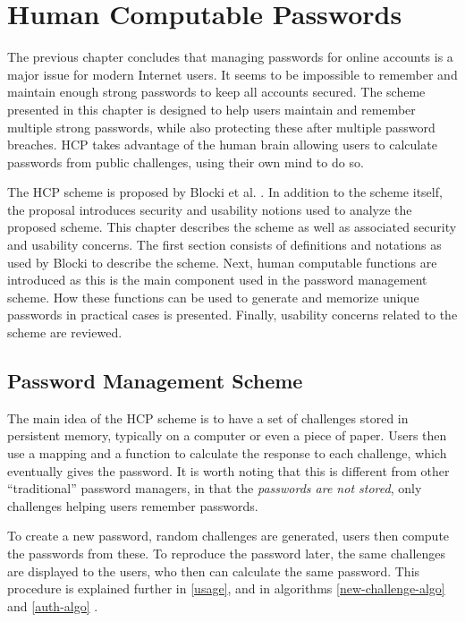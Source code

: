 \chapter{Human Computable Passwords}\label{ch:hcp}
The previous chapter concludes that managing passwords for online accounts is a major issue for modern Internet users. It seems to be impossible to remember and maintain enough strong passwords to keep all accounts secured. The scheme presented in this chapter is designed to help users maintain and remember multiple strong passwords, while also protecting these after multiple password breaches. HCP takes advantage of the human brain allowing users to calculate passwords from public challenges, using their own mind to do so. 

\par The HCP scheme is proposed by Blocki et al. \cite{hcp-blocki}. In addition to the scheme itself, the proposal introduces security and usability notions used to analyze the proposed scheme. This chapter describes the scheme as well as associated security and usability concerns. The first section consists of definitions and notations as used by Blocki \cite{hcp-blocki} to describe the scheme. Next, human computable functions are introduced as this is the main component used in the password management scheme. How these functions can be used to generate and memorize unique passwords in practical cases is presented. Finally, usability concerns related to the scheme are reviewed.

\section{Password Management Scheme}
The main idea of the HCP scheme is to have a set of challenges stored in persistent memory, typically on a computer or even a piece of paper. Users then use a mapping and a function to calculate the response to each challenge, which eventually gives the password. It is worth noting that this is different from other ``traditional'' password managers, in that the \emph{passwords are not stored}, only challenges helping users remember passwords. 
\par To create a new password, random challenges are generated, users then compute the passwords from these. To reproduce the password later, the same challenges are displayed to the users, who then can calculate the same password. This procedure is explained further in \autoref{usage}, and in algorithms \ref{new-challenge-algo} and \ref{auth-algo} .

